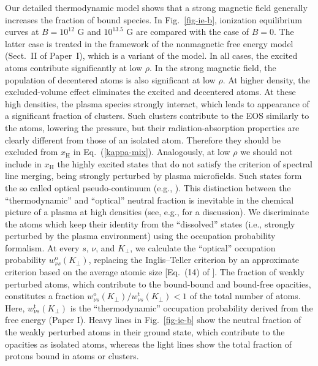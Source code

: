 \documentclass{emulateapj}
\newcommand{\req}[1]{Eq.\ (\ref{#1})}
\begin{document}
Our detailed thermodynamic model shows that a strong magnetic field 
generally increases the fraction of bound species.
In Fig.\ \ref{fig-ie-b}, ionization equilibrium curves 
at $B=10^{12}$ G and $10^{13.5}$ G
are compared with the case of $B=0$.
The latter case is treated in the framework of
 the nonmagnetic free energy model (Sect.\ II of Paper~I),
 which is a variant of the \citet{SC91,SC92} model.
In all cases, the excited atoms contribute significantly
at low $\rho$. In the strong magnetic field,
the population of decentered atoms
is also significant at low $\rho$.
At higher density, the excluded-volume effect eliminates
the excited and decentered atoms. 
At these high densities,
 the plasma species strongly interact,
 which leads to appearance of a significant fraction of
 clusters. Such clusters contribute to the EOS
 similarly to the atoms, lowering the pressure, but their
 radiation-absorption properties are clearly different from 
 those of an isolated atom. Therefore they
 should be excluded from $x_\mathrm{H}$ in \req{kappa-mix}.
 Analogously, at low $\rho$ we should not include in $x_\mathrm{H}$
 the highly excited states that do not satisfy the 
\citet{InglisTeller} criterion of spectral line 
merging, being strongly perturbed by plasma microfields.
Such states form the so called optical pseudo-continuum 
(e.g., \citealp*{dappen87}).
This distinction between the ``thermodynamic''
and ``optical'' neutral fraction is inevitable in the
chemical picture of a plasma at high densities
(see, e.g., \citealp{P96b} for a discussion).
We discriminate the atoms which keep their identity
from the ``dissolved'' states
(i.e., strongly perturbed by the plasma environment) 
using the occupation probability formalism.
At every $s$, $\nu$, and $K_\perp$, we calculate 
the ``optical'' occupation probability
$w_{\nu s}^\mathrm{o}(K_\perp)$, replacing the Inglis--Teller criterion
by an approximate criterion based on the average atomic 
size [Eq.~(14) of \citet{PP95}].
The fraction of weakly perturbed atoms,
which contribute to the bound-bound and 
bound-free opacities, constitutes a fraction
$w_{\nu s}^\mathrm{o}(K_\perp)/w_{\nu s}^\mathrm{t}(K_\perp) < 1$ 
of the total number of atoms.
Here, $w_{\nu s}^\mathrm{t}(K_\perp)$
is the ``thermodynamic'' occupation probability derived from 
the free energy (Paper I).
 Heavy lines in Fig.\ \ref{fig-ie-b} show the 
 neutral fraction of the weakly perturbed atoms in their ground state,
 which contribute to the opacities as isolated atoms,
 whereas the light lines show the total fraction of protons
 bound in atoms or clusters.
\end{document}
